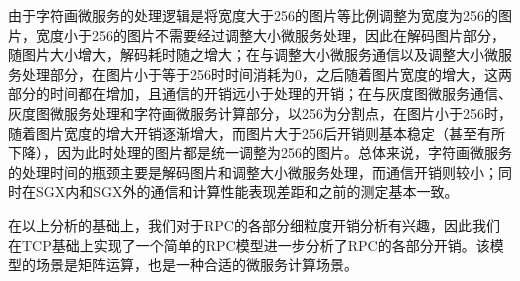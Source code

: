 由于字符画微服务的处理逻辑是将宽度大于256的图片等比例调整为宽度为256的图片，宽度小于256的图片不需要经过调整大小微服务处理，因此在解码图片部分，随图片大小增大，解码耗时随之增大；在与调整大小微服务通信以及调整大小微服务处理部分，在图片小于等于256时时间消耗为0，之后随着图片宽度的增大，这两部分的时间都在增加，且通信的开销远小于处理的开销；在与灰度图微服务通信、灰度图微服务处理和字符画微服务计算部分，以256为分割点，在图片小于256时，随着图片宽度的增大开销逐渐增大，而图片大于256后开销则基本稳定（甚至有所下降），因为此时处理的图片都是统一调整为256的图片。总体来说，字符画微服务的处理时间的瓶颈主要是解码图片和调整大小微服务处理，而通信开销则较小；同时在SGX内和SGX外的通信和计算性能表现差距和之前的测定基本一致。

在以上分析的基础上，我们对于RPC的各部分细粒度开销分析有兴趣，因此我们在TCP基础上实现了一个简单的RPC模型进一步分析了RPC的各部分开销。该模型的场景是矩阵运算，也是一种合适的微服务计算场景。

